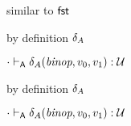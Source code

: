 {\begin{lamportproof*}
    \begin{pfproof}
      \qedstep
        \begin{pfproof}
          similar to $\mathsf{fst}$
        \end{pfproof}
    \end{pfproof}

    \begin{pfproof}
        \begin{pfproof}
          by definition $\delta_{A}$
        \end{pfproof}
      \qedstep
        \begin{pfproof}
          ${\cdot} \vdash_{\mathsf{A}} \delta_{A}(\textit{binop}, v_0, v_1) : {\mathcal U}$
        \end{pfproof}
    \end{pfproof}

    \begin{pfproof}
        \begin{pfproof}
          by definition $\delta_{A}$
        \end{pfproof}
      \qedstep
        \begin{pfproof}
          ${\cdot} \vdash_{\mathsf{A}} \delta_{A}(\textit{binop}, v_0, v_1) : {\mathcal U}$
        \end{pfproof}
    \end{pfproof}

\end{lamportproof*}}

